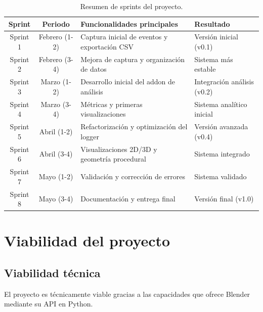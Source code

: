 \begin{table}[H]
\centering
\small
\begin{tabular}{|c|c|p{5cm}|p{4cm}|}
\hline
\textbf{Sprint} & \textbf{Periodo} & \textbf{Funcionalidades principales} & \textbf{Resultado} \\
\hline

Sprint 1 & Febrero (1-2) & Captura inicial de eventos y exportación CSV & Versión inicial (v0.1) \\
\hline

Sprint 2 & Febrero (3-4) & Mejora de captura y organización de datos & Sistema más estable \\
\hline

Sprint 3 & Marzo (1-2) & Desarrollo inicial del addon de análisis & Integración análisis (v0.2) \\
\hline

Sprint 4 & Marzo (3-4) & Métricas y primeras visualizaciones & Sistema analítico inicial \\
\hline

Sprint 5 & Abril (1-2) & Refactorización y optimización del logger & Versión avanzada (v0.4) \\
\hline

Sprint 6 & Abril (3-4) & Visualizaciones 2D/3D y geometría procedural & Sistema integrado \\
\hline

Sprint 7 & Mayo (1-2) & Validación y corrección de errores & Sistema validado \\
\hline

Sprint 8 & Mayo (3-4) & Documentación y entrega final & Versión final (v1.0) \\
\hline

\end{tabular}
\caption{Resumen de sprints del proyecto.}
\label{tab:sprints_resumen}
\end{table}

\section{Viabilidad del proyecto}

\subsection{Viabilidad técnica}

El proyecto es técnicamente viable gracias a las capacidades que ofrece Blender mediante su API en Python.

